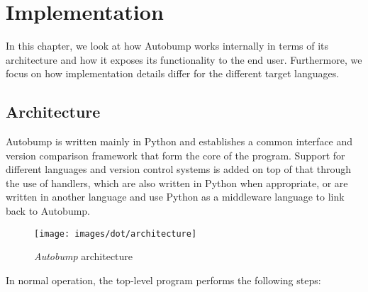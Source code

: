 \documentclass{l4proj}
\begin{document}
\chapter{Implementation}
\label{Implementation}

In this chapter, we look at how Autobump works internally in terms of
its architecture and how it exposes its functionality to the end
user. Furthermore, we focus on how implementation details differ for
the different target languages.

\section{Architecture}
\label{Architecture}

Autobump is written mainly in Python and establishes a common
interface and version comparison framework that form the core of the
program. Support for different languages and version control systems
is added on top of that through the use of handlers, which are also
written in Python when appropriate, or are written in another language
and use Python as a middleware language to link back to Autobump.

\begin{figure}
\label{ArchitectureFig}
\centering
\texttt{[image: images/dot/architecture]}
\caption{\textit{Autobump} architecture}
\end{figure}

In normal operation, the top-level program performs the
following steps:
\end{document}

